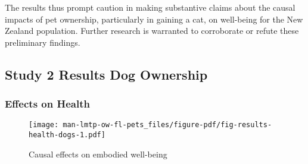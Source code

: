 \documentclass[
  singlecolumn,
  9pt]{article}
\begin{document}
The results thus prompt caution in making substantive claims about the
causal impacts of pet ownership, particularly in gaining a cat, on
well-being for the New Zealand population. Further research is warranted
to corroborate or refute these preliminary findings.

\newpage{}

\subsection{Study 2 Results Dog
Ownership}\label{study-2-results-dog-ownership}

\subsubsection{Effects on Health}\label{effects-on-health-1}

\begin{figure}

{\centering \texttt{[image: man-lmtp-ow-fl-pets\_files/figure-pdf/fig-results-health-dogs-1.pdf]}

}

\caption{\label{fig-results-health-dogs}Causal effects on embodied
well-being}

\end{figure}

\newpage{}
\end{document}
